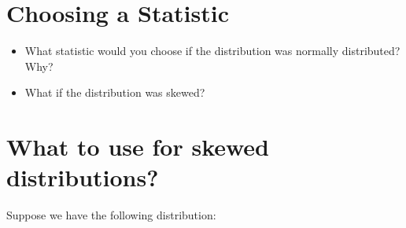 \documentclass[12pt]{article}
\begin{document}
\section{Choosing a Statistic}\label{choosing-a-statistic}

\begin{itemize}
\itemsep1pt\parskip0pt
\item
  What statistic would you choose if the distribution was normally
  distributed? Why?
\item
  What if the distribution was skewed?
\end{itemize}

\section{What to use for skewed
distributions?}\label{what-to-use-for-skewed-distributions}

Suppose we have the following distribution:
\end{document}
